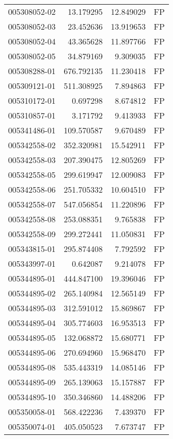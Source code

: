 \begin{tabular}{lrrl}
005308052-02 &   13.179295 &    12.849029 &   FP \\
005308052-03 &   23.452636 &    13.919653 &   FP \\
005308052-04 &   43.365628 &    11.897766 &   FP \\
005308052-05 &   34.879169 &     9.309035 &   FP \\
005308288-01 &  676.792135 &    11.230418 &   FP \\
005309121-01 &  511.308925 &     7.894863 &   FP \\
005310172-01 &    0.697298 &     8.674812 &   FP \\
005310857-01 &    3.171792 &     9.413933 &   FP \\
005341486-01 &  109.570587 &     9.670489 &   FP \\
005342558-02 &  352.320981 &    15.542911 &   FP \\
005342558-03 &  207.390475 &    12.805269 &   FP \\
005342558-05 &  299.619947 &    12.009083 &   FP \\
005342558-06 &  251.705332 &    10.604510 &   FP \\
005342558-07 &  547.056854 &    11.220896 &   FP \\
005342558-08 &  253.088351 &     9.765838 &   FP \\
005342558-09 &  299.272441 &    11.050831 &   FP \\
005343815-01 &  295.874408 &     7.792592 &   FP \\
005343997-01 &    0.642087 &     9.214078 &   FP \\
005344895-01 &  444.847100 &    19.396046 &   FP \\
005344895-02 &  265.140984 &    12.565149 &   FP \\
005344895-03 &  312.591012 &    15.869867 &   FP \\
005344895-04 &  305.774603 &    16.953513 &   FP \\
005344895-05 &  132.068872 &    15.680771 &   FP \\
005344895-06 &  270.694960 &    15.968470 &   FP \\
005344895-08 &  535.443319 &    14.085146 &   FP \\
005344895-09 &  265.139063 &    15.157887 &   FP \\
005344895-10 &  350.346860 &    14.488206 &   FP \\
005350058-01 &  568.422236 &     7.439370 &   FP \\
005350074-01 &  405.050523 &     7.673747 &   FP \\

\end{tabular}
